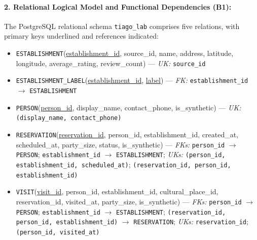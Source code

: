 \paragraph{2. Relational Logical Model and Functional Dependencies (B1):}
The PostgreSQL relational schema \texttt{tiago\_\allowbreak{}lab} comprises five relations, with primary keys underlined and references indicated:
\begin{itemize}\raggedright
\item \texttt{ESTABLISHMENT}(\underline{establishment\_id}, source\_id, name, address, latitude, longitude, average\_rating, review\_count) --- \emph{UK:} \texttt{source\_\allowbreak{}id}
\item \texttt{ESTABLISHMENT\_\allowbreak{}LABEL}(\underline{establishment\_id}, \underline{label}) --- \emph{FK:} \texttt{establishment\_\allowbreak{}id} $\rightarrow$ \texttt{ESTABLISHMENT}
\item \texttt{PERSON}(\underline{person\_id}, display\_name, contact\_phone, is\_synthetic) --- \emph{UK:} \texttt{(\allowbreak{}display\_\allowbreak{}name,\allowbreak{} contact\_\allowbreak{}phone)}
\item \texttt{RESERVATION}(\underline{reservation\_id}, person\_id, establishment\_id, created\_at, scheduled\_at, party\_size, status, is\_synthetic) --- \emph{FKs:} \texttt{person\_\allowbreak{}id} $\rightarrow$ \texttt{PERSON}; \texttt{establishment\_\allowbreak{}id} $\rightarrow$ \texttt{ESTABLISHMENT}; \emph{UKs:} \texttt{(\allowbreak{}person\_\allowbreak{}id,\allowbreak{} establishment\_\allowbreak{}id,\allowbreak{} scheduled\_\allowbreak{}at)}; \texttt{(\allowbreak{}reservation\_\allowbreak{}id,\allowbreak{} person\_\allowbreak{}id,\allowbreak{} establishment\_\allowbreak{}id)}
\item \texttt{VISIT}(\underline{visit\_id}, person\_id, establishment\_id, cultural\_place\_id, reservation\_id, visited\_at, party\_size, is\_synthetic) --- \emph{FKs:} \texttt{person\_\allowbreak{}id} $\rightarrow$ \texttt{PERSON}; \texttt{establishment\_\allowbreak{}id} $\rightarrow$ \texttt{ESTABLISHMENT}; \texttt{(\allowbreak{}reservation\_\allowbreak{}id,\allowbreak{} person\_\allowbreak{}id,\allowbreak{} establishment\_\allowbreak{}id)} $\rightarrow$ \texttt{RESERVATION}; \emph{UKs:} \texttt{reservation\_\allowbreak{}id}; \texttt{(\allowbreak{}person\_\allowbreak{}id,\allowbreak{} visited\_\allowbreak{}at)}
\end{itemize}
